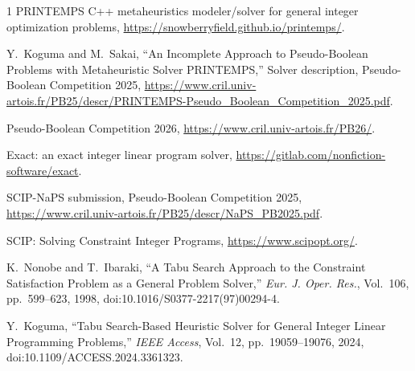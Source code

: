 \documentclass[conference]{IEEEtran}
\begin{document}
\begin{thebibliography}{1}
PRINTEMPS C++ metaheuristics modeler/solver for general integer optimization problems, \url{https://snowberryfield.github.io/printemps/}.

Y.~Koguma and M.~Sakai, ``An Incomplete Approach to Pseudo-Boolean Problems with Metaheuristic Solver PRINTEMPS,'' Solver description, Pseudo-Boolean Competition 2025, \url{https://www.cril.univ-artois.fr/PB25/descr/PRINTEMPS-Pseudo_Boolean_Competition_2025.pdf}.

Pseudo-Boolean Competition 2026, \url{https://www.cril.univ-artois.fr/PB26/}.

Exact: an exact integer linear program solver, \url{https://gitlab.com/nonfiction-software/exact}.

SCIP-NaPS submission, Pseudo-Boolean Competition 2025, \url{https://www.cril.univ-artois.fr/PB25/descr/NaPS_PB2025.pdf}.

SCIP: Solving Constraint Integer Programs, \url{https://www.scipopt.org/}.

K.~Nonobe and T.~Ibaraki, ``A Tabu Search Approach to the Constraint Satisfaction Problem as a General Problem Solver,'' \emph{Eur. J. Oper. Res.}, Vol.~106, pp.~599--623, 1998, doi:10.1016/S0377-2217(97)00294-4.

Y.~Koguma, ``Tabu Search-Based Heuristic Solver for General Integer Linear Programming Problems,'' \emph{IEEE Access}, Vol.~12, pp.~19059--19076, 2024, doi:10.1109/ACCESS.2024.3361323.

\end{thebibliography}
\end{document}

